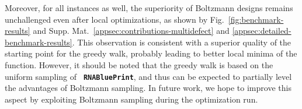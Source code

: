 \documentclass[]{bmcart}
\newcommand{\Obj}{\text{\rm MultiDefect}}
\newcommand{\RNAblueprint}{{\tt \bfseries{}\color{black!85} RNA\textcolor{blue!70!black}{Blue}Print}}
\newcommand{\ourprog}{{\tt \bfseries{}\color{black!85}RNA\textcolor{red!70!black}{Red}Print}}
\begin{document}
%
Moreover, for all instances as well, the superiority of Boltzmann designs
remains unchallenged even after local optimizations, as shown by
Fig.~\ref{fig:benchmark-results} and Supp. Mat.~\ref{appsec:contributions-multidefect}
and \ref{appsec:detailed-benchmark-results}. This observation is consistent with a
superior quality of the starting point for the greedy walk, probably leading
to better local minima of the \Obj{} function. However, it should be noted
that the greedy walk is based on the uniform sampling of
\RNAblueprint{}, and thus can be expected to partially level the
advantages of Boltzmann sampling. In future work, we hope to improve
this aspect by exploiting Boltzmann sampling during the
optimization run.

%
%
\end{document}
